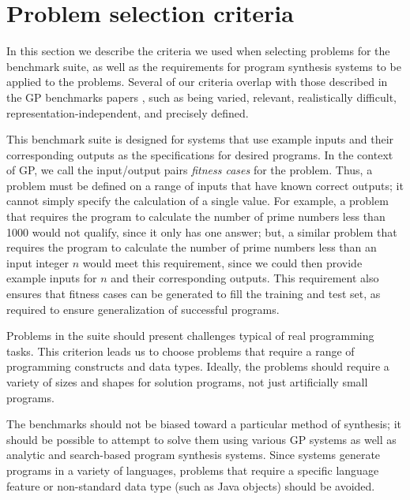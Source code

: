 \documentclass{sig-alternate}
\begin{document}
\section{Problem selection criteria} \label{requirements}

In this section we describe the criteria we used when selecting problems for the benchmark suite, as well as the requirements for program synthesis systems to be applied to the problems. Several of our criteria overlap with those described in the GP benchmarks papers \cite{McDermott:2012:GECCO, White:2013:BGB:2441218.2441242}, such as being varied, relevant, realistically difficult, representation-independent, and precisely defined. 

This benchmark suite is designed for systems that use example inputs and their corresponding outputs as the specifications for desired programs. In the context of GP, we call the input/output pairs \textit{fitness cases} for the problem. Thus, a problem must be defined on a range of inputs that have known correct outputs; it cannot simply specify the calculation of a single value. For example, a problem that requires the program to calculate the number of prime numbers less than 1000 would not qualify, since it only has one answer; but, a similar problem that requires the program to calculate the number of prime numbers less than an input integer $n$ would meet this requirement, since we could then provide example inputs for $n$ and their corresponding outputs. This requirement also ensures that fitness cases can be generated to fill the training and test set, as required to ensure generalization of successful programs.

Problems in the suite should present challenges typical of real programming tasks. 
This criterion leads us to choose problems that require a range of programming constructs and data types. Ideally, the problems should require a variety of sizes and shapes for solution programs, not just artificially small programs. 

The benchmarks should not be biased toward a particular method of synthesis; it should be possible to attempt to solve them using various GP systems as well as analytic and search-based program synthesis systems. Since systems generate programs in a variety of languages, problems that require a specific language feature or non-standard data type (such as Java objects) should be avoided.
\end{document}

